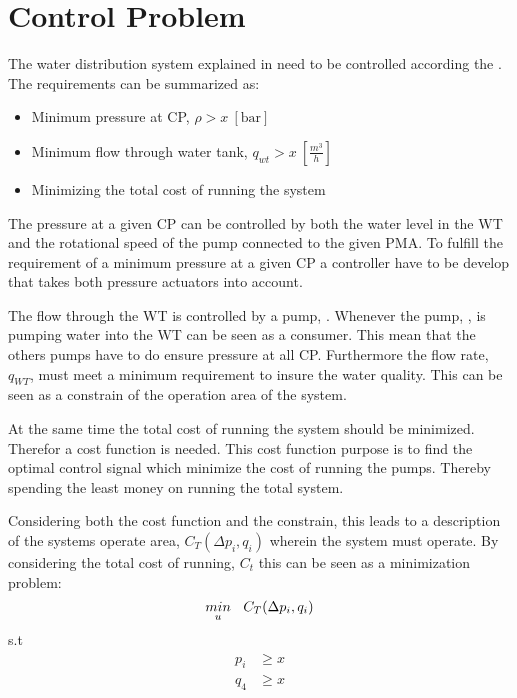 \section{Control Problem}
\label{control_problem}

The water distribution system explained in  need to be controlled according the . The requirements can be summarized as: 

\begin{itemize}
	\item Minimum pressure at CP, $\rho > x \:[\text{bar}]$
	\item Minimum flow through water tank, $q_{wt} > x \:[\frac{m^3}{h}]$
	\item Minimizing the total cost of running the system
\end{itemize}

The pressure at a given CP can be controlled by both the water level in the WT and the rotational speed of the pump connected to the given PMA. To fulfill the requirement of a minimum pressure at a given CP a controller have to be develop that takes both pressure actuators into account. 

The flow through the WT is controlled by a pump, . Whenever the pump, , is pumping water into the WT can be seen as a consumer. This mean that the others pumps have to do ensure pressure at all CP. Furthermore the flow rate, $q_{WT}$, must meet a minimum requirement to insure the water quality. This can be seen as a constrain of the operation area of the system. 

At the same time the total cost of running the system should be minimized. Therefor a cost function is needed. This cost function purpose is to find the optimal control signal which minimize the cost of running the pumps. Thereby spending the least money on running the total system. 

Considering both the cost function and the constrain, this leads to a description of the systems operate area, $C_T(\Delta{p}_i,q_i)$ wherein the system must operate. By considering the total cost of running, $C_t$ this can be seen as a minimization problem:
\begin{equation}
\underset{u}{min} \: \: \: \: C_T(\Delta{p}_i,q_i) \\
\end{equation}
\vspace*{-0.4mm}
s.t 
\vspace*{-0.4mm}
\begin{align*}
p_i &\geq x \\
q_4 &\geq x 
\end{align*}

